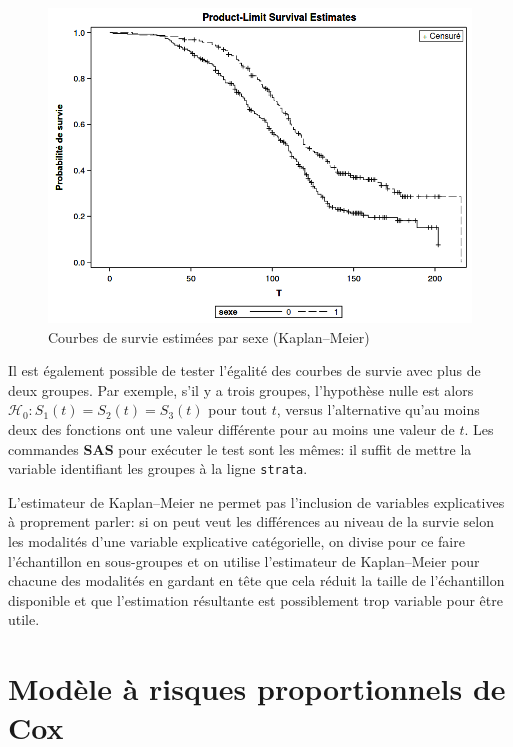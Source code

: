\documentclass[
  11pt,
  letterpaper,
]{book}
\theoremstyle{definition}
\theoremstyle{definition}
\theoremstyle{definition}
\theoremstyle{definition}
\theoremstyle{remark}
\begin{document}
\begin{figure}

{\centering \includegraphics[width=0.83\linewidth]{figures/05-survie-e10} 

}

\caption{Courbes de survie estimées par sexe (Kaplan--Meier)}\label{fig:fig5-e10}
\end{figure}

Il est également possible de tester l'égalité des courbes de survie avec plus de deux groupes. Par exemple, s'il y a trois groupes, l'hypothèse nulle est alors \(\mathcal{H}_0: S_1(t)=S_2(t)=S_3(t)\) pour tout \(t\), versus l'alternative qu'au moins deux des fonctions ont une valeur différente pour au moins une valeur de \(t\). Les commandes \textbf{SAS} pour exécuter le test sont les mêmes: il suffit de mettre la variable identifiant les groupes à la ligne \texttt{strata}.

L'estimateur de Kaplan--Meier ne permet pas l'inclusion de variables explicatives à proprement parler: si on peut veut les différences au niveau de la survie selon les modalités d'une variable explicative catégorielle, on divise pour ce faire l'échantillon en sous-groupes et on utilise l'estimateur de Kaplan--Meier pour chacune des modalités en gardant en tête que cela réduit la taille de l'échantillon disponible et que l'estimation résultante est possiblement trop variable pour être utile.

\hypertarget{moduxe8le-uxe0-risques-proportionnels-de-cox}{%
\section{Modèle à risques proportionnels de Cox}\label{moduxe8le-uxe0-risques-proportionnels-de-cox}}
\end{document}
